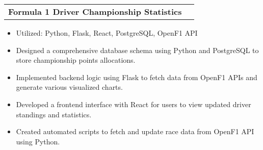 \documentclass[letterpaper,11pt]{article}
\makeatletter
\newcommand{\resumeItem}[1]{
  \item\small{
    {#1 \vspace{-5pt}}
  }
}
\newcommand{\resumeProjectHeading}[2]{
    \item
    \begin{tabular*}{0.97\textwidth}{l@{\extracolsep{\fill}}r@{\hspace{-0.2in}}}
        \small#1 & #2 \\
    \end{tabular*}\vspace{-7pt}
}
\newcommand{\resumeItemListStart}{\begin{itemize}[leftmargin=0.15in, rightmargin=0.15in]}
\newcommand{\resumeItemListEnd}{\end{itemize}\vspace{-7pt}}
\makeatother
\begin{document}
        \resumeProjectHeading
            {\textbf{Formula 1 Driver Championship Statistics} {}}{}
            \resumeItemListStart
                \resumeItem{Utilized: Python, Flask, React, PostgreSQL, OpenF1 API}
                \resumeItem{Designed a comprehensive database schema using Python and PostgreSQL to store championship points allocations.}
                \resumeItem{Implemented backend logic using Flask to fetch data from OpenF1 APIs and generate various visualized charts.}
                \resumeItem{Developed a frontend interface with React for users to view updated driver standings and statistics.}            
                \resumeItem{Created automated scripts to fetch and update race data from OpenF1 API using Python.}            
            \resumeItemListEnd


        
        
\end{document}
